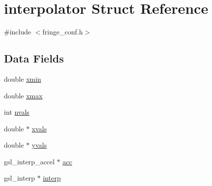 \hypertarget{structinterpolator}{
\section{interpolator Struct Reference}
\label{structinterpolator}
}


{\ttfamily \#include $<$fringe\_\-conf.h$>$}\subsection*{Data Fields}
\begin{DoxyCompactItemize}
\item 
double \hyperlink{structinterpolator_a09c1238a6c4be948ef51e29676074b6f}{xmin}
\item 
double \hyperlink{structinterpolator_a4ccf4f1e42f5207f311bffcbebb7ea9c}{xmax}
\item 
int \hyperlink{structinterpolator_a058a378f76dfb0349cd2016f450a7332}{nvals}
\item 
double $\ast$ \hyperlink{structinterpolator_a0114ddc19b1dd09d7920d11970e22a8e}{xvals}
\item 
double $\ast$ \hyperlink{structinterpolator_a990b3a655c74b64fd02f04b5fc344ff0}{yvals}
\item 
gsl\_\-interp\_\-accel $\ast$ \hyperlink{structinterpolator_ac56df03bb67d65c1ebfd99a4c0d5438b}{acc}
\item 
gsl\_\-interp $\ast$ \hyperlink{structinterpolator_abc3ee4eff3db3bcae7407d825710fb0d}{interp}
\end{DoxyCompactItemize}


